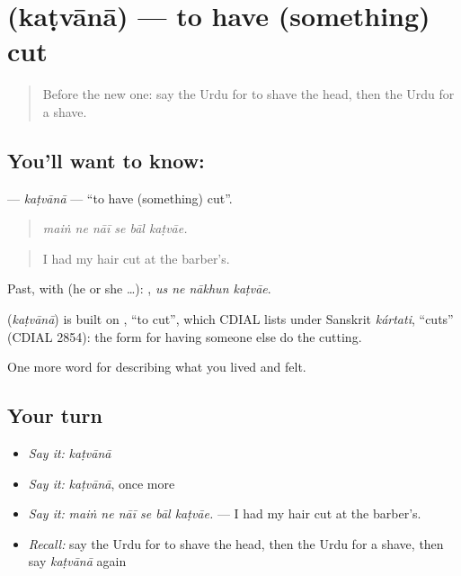 \section[\texorpdfstring{\ur{کٹوانا} (kaṭvānā)}{کٹوانا (kaṭvānā)}]{ (kaṭvānā) — to have (something) cut}

\label{lesson:UR-C482-katvana}



\begin{quote}
Before the new one: say the Urdu for to shave the head, then the Urdu for a shave.
\end{quote}

\subsection*{You'll want to know: }
\textbf{} — \emph{kaṭvānā} — \textquotedblleft{}to have (something) cut\textquotedblright{}.

\begin{quote}
     
\end{quote}

\begin{quote}
\emph{maiṅ ne nāī se bāl kaṭvāe.}
\end{quote}

\begin{quote}
I had my hair cut at the barber's.
\end{quote}

Past, with  (he or she …):    , \emph{us ne nākhun kaṭvāe}.

\begin{cousinweb}
\textbf{} (\emph{kaṭvānā}) is built on \textbf{}, \textquotedblleft{}to cut\textquotedblright{}, which CDIAL lists under Sanskrit \emph{kártati}, \textquotedblleft{}cuts\textquotedblright{} (CDIAL 2854): the form for having someone else do the cutting.
\end{cousinweb}

\begin{grammarlens}[title={What you've built}]
One more word for describing what you lived and felt.
\end{grammarlens}

\subsection*{Your turn}
\begin{itemize}
\raggedright
  \item \emph{Say it:} \emph{kaṭvānā}
  \item \emph{Say it:} \emph{kaṭvānā}, once more
  \item \emph{Say it:} \emph{maiṅ ne nāī se bāl kaṭvāe.} — I had my hair cut at the barber's.
  \item \emph{Recall:} say the Urdu for to shave the head, then the Urdu for a shave, then say \emph{kaṭvānā} again
\end{itemize}

